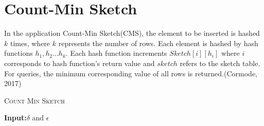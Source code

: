 \documentclass[10pt, conference, compsocconf]{IEEEtran}
\renewcommand{\algorithmicrequire}{\textbf{Input:}}
\begin{document}
    \section{Count-Min Sketch}

In the application Count-Min Sketch(CMS), the element to be inserted is hashed $k$ times, where $k$ represents the number of rows. Each element is hashed by hash functions $h_{1},h_{2} \dots h_{k}$. Each hash function increments  $Sketch[i][h_{i}]$ where $i$ corresponds to  hash function's return value and $sketch$ refers to the sketch table. For queries, the minimum corresponding value of all rows is returned.(Cormode, 2017)

  	
  \renewcommand{\baselinestretch}{0.9}
  \begin{algorithm}[H]
  	\small
 
  	\caption{\textsc{Count Min Sketch}}
  	 	\label{cms}
  	\algorithmicrequire{$\delta$ and $\epsilon$}
  	\begin{algorithmic}[1]
		  	

				\EndFor
			\EndFor


	\end{algorithmic}

  \end{algorithm}
  	
  	
  	
\end{document}
